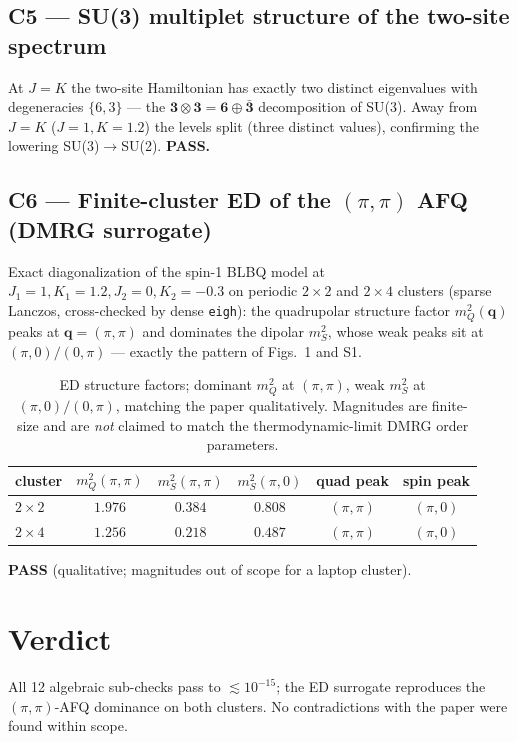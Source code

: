 \documentclass[11pt]{article}
\begin{document}
\subsection*{C5 --- SU(3) multiplet structure of the two-site spectrum}
At $J=K$ the two-site Hamiltonian has exactly two distinct eigenvalues with
degeneracies $\{6,3\}$ --- the $\mathbf 3\otimes\mathbf 3=\mathbf 6\oplus\bar{\mathbf 3}$
decomposition of SU(3). Away from $J=K$ ($J{=}1,K{=}1.2$) the levels split (three
distinct values), confirming the lowering SU(3)$\to$SU(2). \textbf{PASS.}

\subsection*{C6 --- Finite-cluster ED of the $(\pi,\pi)$ AFQ (DMRG surrogate)}
Exact diagonalization of the spin-1 BLBQ model at $J_1{=}1,K_1{=}1.2,J_2{=}0,K_2{=}-0.3$
on periodic $2\times2$ and $2\times4$ clusters (sparse Lanczos, cross-checked by dense
\texttt{eigh}): the quadrupolar structure factor $m_Q^2(\mathbf q)$ peaks at
$\mathbf q=(\pi,\pi)$ and dominates the dipolar $m_S^2$, whose weak peaks sit at
$(\pi,0)/(0,\pi)$ --- exactly the pattern of Figs.~1 and S1.

\begin{table}[h]\centering
\begin{tabular}{lccccc}
\toprule
cluster & $m_Q^2(\pi,\pi)$ & $m_S^2(\pi,\pi)$ & $m_S^2(\pi,0)$ & quad peak & spin peak\\
\midrule
$2\times2$ & $1.976$ & $0.384$ & $0.808$ & $(\pi,\pi)$ & $(\pi,0)$\\
$2\times4$ & $1.256$ & $0.218$ & $0.487$ & $(\pi,\pi)$ & $(\pi,0)$\\
\bottomrule
\end{tabular}
\caption{ED structure factors; dominant $m_Q^2$ at $(\pi,\pi)$, weak $m_S^2$ at
$(\pi,0)/(0,\pi)$, matching the paper qualitatively. Magnitudes are finite-size and are
\emph{not} claimed to match the thermodynamic-limit DMRG order parameters.}
\end{table}
\textbf{PASS} (qualitative; magnitudes out of scope for a laptop cluster).

\section{Verdict}
\begin{center}
\end{center}

All 12 algebraic sub-checks pass to $\lesssim10^{-15}$; the ED surrogate reproduces the
$(\pi,\pi)$-AFQ dominance on both clusters. No contradictions with the paper were found
within scope.
\end{document}
